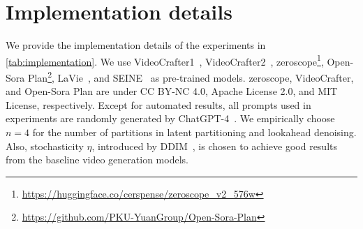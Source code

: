 \clearpage
\section{Implementation details}
\label{app:implementation_details}

We provide the implementation details of the experiments in \cref{tab:implementation}.
We use VideoCrafter1~\citep{chen2023videocrafter1}, VideoCrafter2~\citep{chen2024videocrafter2}, zeroscope\footnote{\url{https://huggingface.co/cerspense/zeroscope\_v2\_576w}}, Open-Sora Plan\footnote{\url{https://github.com/PKU-YuanGroup/Open-Sora-Plan}}, LaVie~\citep{wang2023lavie}, and SEINE~\citep{chen2023seine} as pre-trained models.
zeroscope, VideoCrafter, and Open-Sora Plan are under CC BY-NC 4.0, Apache License 2.0, and MIT License, respectively.
Except for automated results, all prompts used in experiments are randomly generated by ChatGPT-4~\citep{openai2023gpt}.
We empirically choose $n=4$ for the number of partitions in latent partitioning and lookahead denoising.
Also, stochasticity $\eta$, introduced by DDIM~\citep{song2021denoising}, is chosen to achieve good results from the baseline video generation models.


